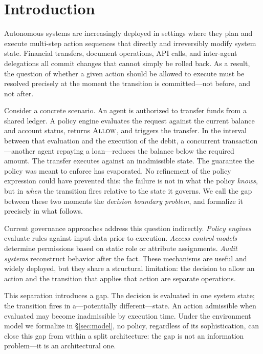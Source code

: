 \documentclass[11pt]{article}
\theoremstyle{plain}
\theoremstyle{definition}
\theoremstyle{remark}
\newcommand{\Allow}{\textsc{Allow}}
\begin{document}
\tableofcontents
\newpage

\section{Introduction}
\label{sec:intro}

Autonomous systems are increasingly deployed in settings where they plan and
execute multi-step action sequences that directly and irreversibly modify system
state.  Financial transfers, document operations, API calls, and inter-agent
delegations all commit changes that cannot simply be rolled back.  As a result,
the question of whether a given action should be allowed to execute must be
resolved precisely at the moment the transition is committed---not before, and
not after.

Consider a concrete scenario.  An agent is authorized to transfer funds from
a shared ledger.  A policy engine evaluates the request against the current
balance and account status, returns $\Allow$, and triggers the transfer.  In
the interval between that evaluation and the execution of the debit, a
concurrent transaction---another agent repaying a loan---reduces the balance
below the required amount.  The transfer executes against an inadmissible
state.  The guarantee the policy was meant to enforce has evaporated.  No
refinement of the policy expression could have prevented this: the failure
is not in what the policy \emph{knows}, but in \emph{when} the transition
fires relative to the state it governs.  We call the gap between these two
moments the \emph{decision boundary problem}, and formalize it precisely in
what follows.

Current governance approaches address this question indirectly.  \emph{Policy
engines} evaluate rules against input data prior to execution.  \emph{Access
control models} determine permissions based on static role or attribute
assignments.  \emph{Audit systems} reconstruct behavior after the fact.
These mechanisms are useful and widely deployed, but they share a structural
limitation: the decision to allow an action and the transition that applies
that action are separate operations.

This separation introduces a gap.  The decision is evaluated in one system
state; the transition fires in a---potentially different---state.  An action
admissible when evaluated may become inadmissible by execution time.  Under
the environment model we formalize in \S\ref{sec:model}, no policy, regardless
of its sophistication, can close this gap from within a split architecture:
the gap is not an information problem---it is an architectural one.
\end{document}
